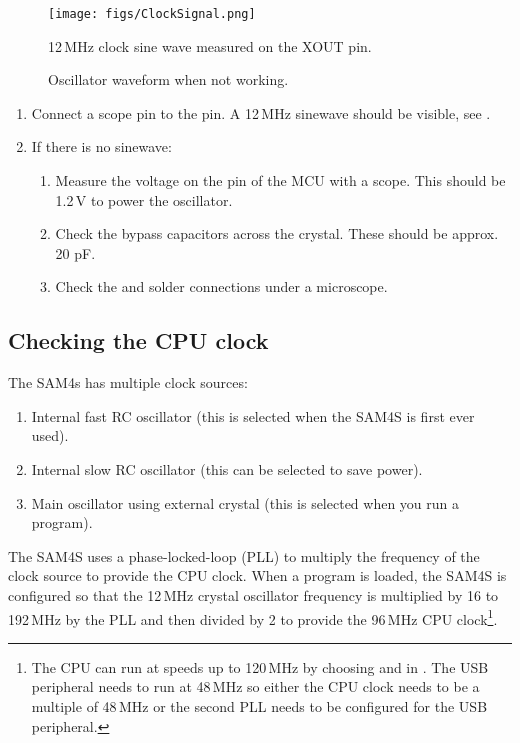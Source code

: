 \begin{figure}[!h]
\centering
\texttt{[image: figs/ClockSignal.png]}
\caption{12\,MHz clock sine wave measured on the XOUT pin.}
\label{fig:xout}
\end{figure}

\begin{figure}[!h]
  \centering
  \caption{Oscillator waveform when not working.}
\end{figure}

\begin{enumerate}
\item Connect a scope pin to the  pin. A 12\,MHz sinewave
  should be visible, see .

\item If there is no sinewave:

  \begin{enumerate}
  \item Measure the voltage on the  pin of the MCU with a
    scope. This should be 1.2\,V to power the oscillator.

  \item Check the bypass capacitors across the crystal.  These should
    be approx. 20 pF.

  \item Check the  and  solder connections under a
    microscope.
  \end{enumerate}
\end{enumerate}


\subsection{Checking the CPU clock}
\label{checking-the-clock}

The SAM4s has multiple clock sources:

\begin{enumerate}
\item
  Internal fast RC oscillator (this is selected when the SAM4S is first
  ever used).
\item
  Internal slow RC oscillator (this can be selected to save power).
\item
  Main oscillator using external crystal (this is selected when you
  run a program).
\end{enumerate}

The SAM4S uses a phase-locked-loop (PLL) to multiply the frequency of
the clock source to provide the CPU clock.  When a program is loaded,
the SAM4S is configured so that the 12\,MHz crystal oscillator
frequency is multiplied by 16 to 192\,MHz by the PLL and then divided
by 2 to provide the 96\,MHz CPU clock\footnote{The CPU can run at
  speeds up to 120\,MHz by choosing  and
   in .  The USB peripheral needs to
  run at 48\,MHz so either the CPU clock needs to be a multiple of
  48\,MHz or the second PLL needs to be configured for the USB
  peripheral.}.

